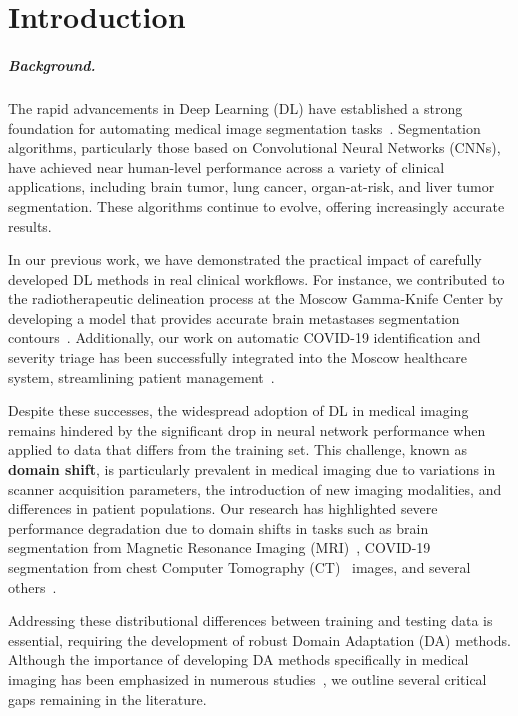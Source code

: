 

\chapter*{Introduction}
\label{chap:Introduction}


\paragraph{Background.}

The rapid advancements in Deep Learning (DL) have established a strong foundation for automating medical image segmentation tasks~\cite{lee2017deep}. Segmentation algorithms, particularly those based on Convolutional Neural Networks (CNNs), have achieved near human-level performance across a variety of clinical applications, including brain tumor, lung cancer, organ-at-risk, and liver tumor segmentation. These algorithms continue to evolve, offering increasingly accurate results.

In our previous work, we have demonstrated the practical impact of carefully developed DL methods in real clinical workflows. For instance, we contributed to the radiotherapeutic delineation process at the Moscow Gamma-Knife Center by developing a model that provides accurate brain metastases segmentation contours~\cite{shirokikh2022systematic}. Additionally, our work on automatic COVID-19 identification and severity triage has been successfully integrated into the Moscow healthcare system, streamlining patient management~\cite{goncharov2021ct,covid-program}.

Despite these successes, the widespread adoption of DL in medical imaging remains hindered by the significant drop in neural network performance when applied to data that differs from the training set. This challenge, known as \textbf{domain shift}, is particularly prevalent in medical imaging due to variations in scanner acquisition parameters, the introduction of new imaging modalities, and differences in patient populations. Our research has highlighted severe performance degradation due to domain shifts in tasks such as brain segmentation from Magnetic Resonance Imaging (MRI)~\cite{shirokikh2020first,zakazov2021anatomy}, COVID-19 segmentation from chest Computer Tomography (CT)~\cite{saparov2021zero,shimovolos2022adaptation} images, and several others~\cite{vasiliuk2023limitations,shirokikh2025m3da}.

Addressing these distributional differences between training and testing data is essential, requiring the development of robust Domain Adaptation (DA) methods. Although the importance of developing DA methods specifically in medical imaging has been emphasized in numerous studies~\cite{gulrajani2020search,uda_survey_2020,zhuang2020comprehensive,peng2018visda,zhang2021empirical}, we outline several critical gaps remaining in the literature.

